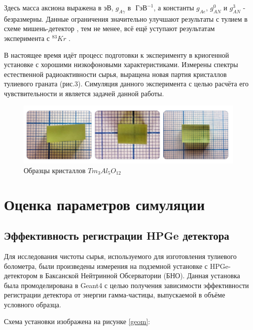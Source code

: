 \documentclass[a4paper,article,14pt]{extarticle}
\begin{document}
Здесь масса аксиона выражена в эВ, $g_{A\gamma }$ в $\text{ ГэВ}^{-1}$, а константы $g_{Ae }$, $g_{AN}^0$ и  $g_{AN}^3$ - безразмерны. Данные ограничения значительно улучшают результаты с тулием в схеме мишень-детектор \cite{Derbin2009}, тем не менее, всё ещё уступают результатам эксперимента с $^{83}Kr$ \cite{Derbin_2017_Kr}.

В настоящее время идёт процесс подготовки к эксперименту в криогенной установке с хорошими низкофоновыми характеристиками. Измерены спектры естественной радиоактивности сырья, выращена новая партия кристаллов тулиевого граната (рис.3). Симуляция данного эксперимента с целью расчёта его чувствительности и является задачей данной работы.


\begin{figure}[h]
    \centering
    \includegraphics[width = 0.75 \textwidth]{images/Crystals.png}
    \caption{Образцы кристаллов $Tm_3Al_5O_{12}$}
    \label{crystals}
\end{figure}


\newpage 

\section{Оценка параметров симуляции}
\subsection{Эффективность регистрации HPGe детектора}

Для исследования чистоты сырья, используемого для изготовления тулиевого болометра, были произведены измерения на подземной установке с HPGe-детектором в Баксанской Нейтринной Обсерватории (БНО). Данная установка была промоделирована в Geant4 с целью получения зависимости эффективности регистрации детектора от энергии гамма-частицы, выпускаемой в объёме условного образца.

Схема установки изображена на рисунке \ref{geom}:
\end{document}
